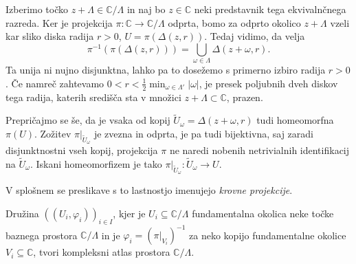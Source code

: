 \documentclass[mat1]{fmfdelo}
\numberwithin{equation}{section}
\newcommand{\C}{\mathbb C}
\newcommand{\om}{\omega}
\newcommand{\inv}{^{-1}}
\newcommand{\torus}{\C/\Lambda}
\newcommand{\abs}[1]{\left\lvert #1 \right\rvert}
\newcommand{\disk}[2]{\Delta(#1, #2)}
\theoremstyle{definition}
\begin{document}
\begin{dokaz}
    Izberimo točko $z + \Lambda \in \torus$ in naj bo $z \in \C$ neki predstavnik tega ekvivalnčnega razreda. Ker je projekcija $\pi: \C \to \torus$ odprta, bomo za odprto okolico $z + \Lambda$ vzeli kar sliko diska radija $r>0$, $U = \pi(\disk{z}{r})$. Tedaj vidimo, da velja 
    \[
        \pi\inv(\pi(\disk{z}{r})) = \bigcup_{\om \in \Lambda} \disk{z + \om}{r}.
    \] 
    Ta unija ni nujno disjunktna, lahko pa to dosežemo s primerno izbiro radija $r>0$. Če namreč zahtevamo $0 < r < \frac12 \min_{\om \in \Lambda'} \abs{\om}$, je presek poljubnih dveh diskov tega radija, katerih središča sta v množici $z + \Lambda \subset \C$, prazen. 

    Prepričajmo se še, da je vsaka od kopij $\tilde{U}_\om = \disk{z + \om}{r}$ tudi homeomorfna $\pi(U)$. Zožitev $\pi|_{\tilde{U}_\om}$ je zvezna in odprta, je pa tudi bijektivna, saj zaradi disjunktnostni vseh kopij, projekcija $\pi$ ne naredi nobenih netrivialnih identifikacij na $\tilde{U}_\om$. Iskani homeomorfizem je tako $\pi|_{\tilde{U}_\om} : \tilde{U}_\om \to U$.
\end{dokaz}

\begin{opomba}
    V splošnem se preslikave s to lastnostjo imenujejo \emph{krovne projekcije}.
\end{opomba}

\begin{trditev}
    Družina $((U_i, \varphi_i))_{i \in I}$, kjer je $U_i \subseteq \torus$ fundamentalna okolica neke točke baznega prostora $\torus$ in je $\varphi_i = (\pi|_{V_i})\inv$ za neko kopijo fundamentalne okolice $V_i \subseteq \C$, tvori kompleksni atlas prostora $\torus$.  
\end{trditev}
\end{document}
